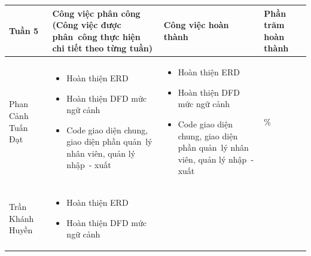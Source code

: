 \documentclass[a4paper,12pt]{report}
\begin{document}
\noindent
\begin{center}
    \begin{longtable}{|>{\centering\arraybackslash}p{3cm}|
        >{\centering\arraybackslash}p{5.5cm}|
        >{\centering\arraybackslash}p{5.5cm}|
        >{\centering\arraybackslash}p{1.5cm}|}
        \hline
        \textbf{Tuần 5}                                                                                                               &
        \textbf{Công việc phân công \newline
            (Công việc được phân~công thực hiện chi tiết theo từng tuần)
        }                                                                                                                             &
        \textbf{Công việc hoàn thành}                                                                                                 &
        \textbf{Phần trăm hoàn thành}                                                                                                         \\
        \hline
        Phan Cảnh Tuấn Đạt                                                                                                            &
        \begin{itemize}
            \item Hoàn thiện ERD
            \item Hoàn thiện DFD mức ngữ cảnh
            \item Code giao diện chung, giao diện phần quản~lý nhân viên, quản lý nhập~- xuất
        \end{itemize}                                             &
        \begin{itemize}
            \item Hoàn thiện ERD
            \item Hoàn thiện DFD mức ngữ cảnh
            \item Code giao diện chung, giao diện phần quản~lý nhân viên, quản lý nhập~- xuất
        \end{itemize}
                                                                                                                                      & 100\% \\
        \hline
        Trần Khánh Huyền                                                                                                              &
        \begin{itemize}
            \item Hoàn thiện ERD
            \item Hoàn thiện DFD mức ngữ cảnh

\end{itemize}
\end{longtable}
\end{center}
\end{document}
